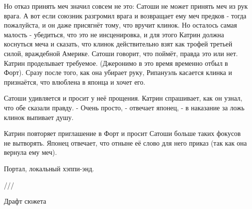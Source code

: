 {{Но отказ принять меч значил совсем не это: Сатоши не может принять меч из рук врага. А вот если союзник разгромил врага и возвращает ему меч предков - тогда пожалуйста, и он даже присягнёт тому, что вручит клинок. Но осталось самая малость - убедиться, что это не инсценировка, и для этого Катрин должна коснуться меча и сказать, что клинок действительно взят как трофей третьей силой, враждебной Америке. Сатоши говорит, что поймёт, правда это или нет. Катрин проделывает требуемое. (Джеронимо в это время временно отбыл в Форт). Сразу после того, как она убирает руку, Рипануэль касается клинка и признаётся, что влюблена в японца и хочет его.

Сатоши удивляется и просит у неё прощения. Катрин спрашивает, как он узнал, что обе сказали правду.
 - Очень просто, - отвечает японец, - в наказание за ложь клинок выпивает душу.

Катрин повторяет приглашение в Форт и просит Сатоши больше таких фокусов не вытворять. Японец отвечает, что отныне её слово для него приказ (так как она вернула ему меч).


Портал, локальный хэппи-энд.





///}} Драфт сюжета

